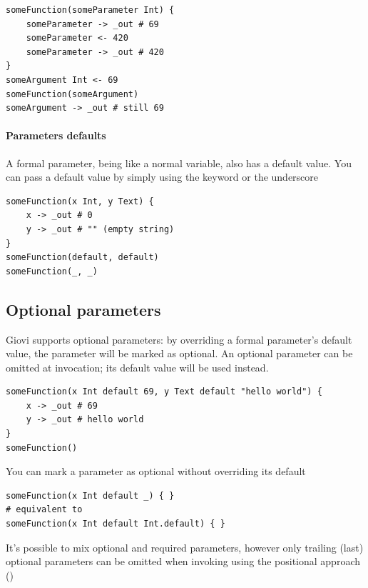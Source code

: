 \begin{verbatim}
someFunction(someParameter Int) {
	someParameter -> _out # 69
	someParameter <- 420
	someParameter -> _out # 420
}
someArgument Int <- 69
someFunction(someArgument)
someArgument -> _out # still 69
\end{verbatim}


\paragraph{Parameters defaults}

A formal parameter, being like a normal variable, also has a default value. You
can pass a default value by simply using the  keyword or the
underscore \code{\_}

\begin{verbatim}
someFunction(x Int, y Text) {
	x -> _out # 0
	y -> _out # "" (empty string)
}
someFunction(default, default)
someFunction(_, _)
\end{verbatim}

\subsection{Optional parameters}

Giovi supports optional parameters: by overriding a formal parameter's default
value, the parameter will be marked as optional. An optional parameter can be
omitted at invocation; its default value will be used instead.

\begin{verbatim}
someFunction(x Int default 69, y Text default "hello world") {
	x -> _out # 69
	y -> _out # hello world
}
someFunction()
\end{verbatim}

You can mark a parameter as optional without overriding its default

\begin{verbatim}
someFunction(x Int default _) { }
# equivalent to
someFunction(x Int default Int.default) { }
\end{verbatim}

It's possible to mix optional and required parameters, however only trailing
(last) optional parameters can be omitted when invoking using the positional
approach ()

